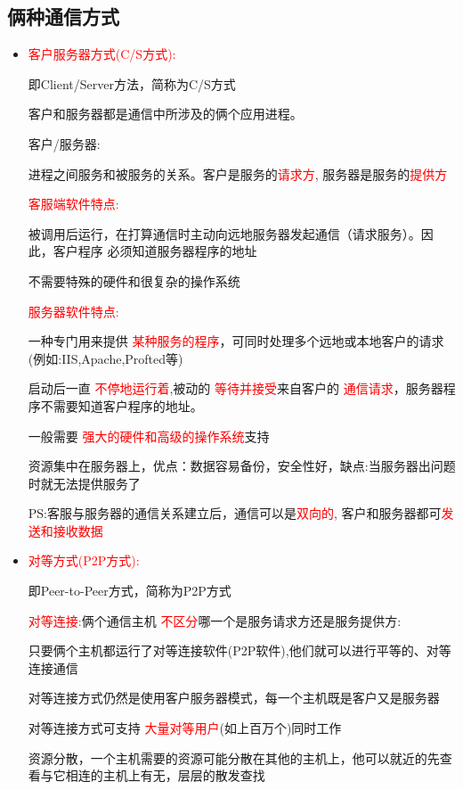 \subsection{俩种通信方式}
\begin{itemize}
    \item \textcolor{red}{客户服务器方式(C/S方式):}
    
    即Client/Server方法，简称为C/S方式

    客户和服务器都是通信中所涉及的俩个应用进程。

    客户/服务器:

    进程之间服务和被服务的关系。客户是服务的\textcolor{red}{请求方},
    服务器是服务的\textcolor{red}{提供方}
    
    \textcolor{red}{客服端软件特点:}

    被调用后运行，在打算通信时主动向远地服务器发起通信（请求服务）。因此，客户程序
    必须知道服务器程序的地址

    不需要特殊的硬件和很复杂的操作系统

    \textcolor{red}{服务器软件特点:}

    一种专门用来提供
    \textcolor{red}{某种服务的程序}，可同时处理多个远地或本地客户的请求(例如:IIS,Apache,Profted等)

    启动后一直
    \textcolor{red}{不停地运行着},被动的
    \textcolor{red}{等待并接受}来自客户的
    \textcolor{red}{通信请求}，服务器程序不需要知道客户程序的地址。
    
    一般需要
    \textcolor{red}{强大的硬件和高级的操作系统}支持
   
    资源集中在服务器上，优点：数据容易备份，安全性好，缺点:当服务器出问题时就无法提供服务了

    
    
    PS:客服与服务器的通信关系建立后，通信可以是\textcolor{red}{双向的},
    客户和服务器都可\textcolor{red}{发送和接收数据}
   


    \item \textcolor{red}{对等方式(P2P方式):}
    
    即Peer-to-Peer方式，简称为P2P方式

    \textcolor{red}{对等连接:}俩个通信主机
    \textcolor{red}{不区分}哪一个是服务请求方还是服务提供方:

    只要俩个主机都运行了对等连接软件(P2P软件),他们就可以进行平等的、对等连接通信

    对等连接方式仍然是使用客户服务器模式，每一个主机既是客户又是服务器

    对等连接方式可支持
    \textcolor{red}{大量对等用户}(如上百万个)同时工作

    资源分散，一个主机需要的资源可能分散在其他的主机上，他可以就近的先查看与它相连的主机上有无，层层的散发查找

    
\end{itemize}

